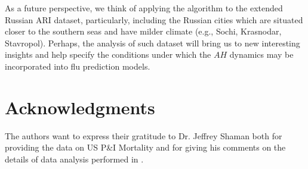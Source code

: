 \documentclass[procedia]{easychair}
\begin{document}
As a future perspective, we think of applying the algorithm to the extended Russian ARI dataset, particularly, including the Russian cities which are situated closer to the southern seas and have milder climate (e.g., Sochi, Krasnodar, Stavropol). Perhaps, the analysis of such dataset will bring us to new interesting insights and help specify the conditions under which the $AH$ dynamics may be incorporated into flu prediction models.

%



\section{Acknowledgments}

The authors want to express their gratitude to Dr. Jeffrey Shaman both for providing the data on US P\&I Mortality and for giving his comments on the details of data analysis performed in \cite{shaman2010absolute}.


%
\label{sect:bib}

%
%
%


\end{document}
